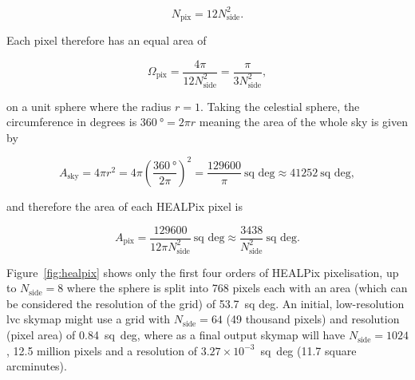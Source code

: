 \begin{colsection}
\begin{colsection}
\begin{equation}
    N_\text{pix} = 12 N_\text{side}^2.
    \label{eq:healpix_npix}
\end{equation}

Each pixel therefore has an equal area of

\begin{equation}
    \Omega_\text{pix} = \frac{4\pi}{12 N_\text{side}^2} = \frac{\pi}{3 N_\text{side}^2},
    \label{eq:healpix_area}
\end{equation}

on a unit sphere where the radius $r=1$. Taking the celestial sphere, the circumference in degrees is $\SI{360}{\degree} = 2 \pi r$ meaning the area of the whole sky is given by

\begin{equation}
    A_\text{sky} = 4 \pi r^2 = 4 \pi \left ( \frac{\SI{360}{\degree}}{2 \pi} \right )^2 = \frac{129600}{\pi}~\text{sq deg} \approx 41252~\text{sq deg} , %
    \label{eq:sky_area}
\end{equation}

and therefore the area of each HEALPix pixel is

\begin{equation}
    A_\text{pix} = \frac{129600}{12 \pi N_\text{side}^2}~\text{sq~deg} \approx \frac{3438}{N_\text{side}^2}~\text{sq~deg}.
    \label{eq:healpix_area_degrees}
\end{equation}

Figure~\ref{fig:healpix} shows only the first four orders of HEALPix pixelisation, up to $N_\text{side} = 8$ where the sphere is split into 768 pixels each with an area (which can be considered the resolution of the grid) of 53.7~sq deg. An initial, low-resolution \gls{lvc} skymap might use a grid with $N_\text{side} = 64$ (49 thousand pixels) and resolution (pixel area) of 0.84~sq~deg, where as a final output skymap will have $N_\text{side} = 1024$, 12.5 million pixels and a resolution of $3.27 \times 10^{-3}$~sq~deg (11.7 square arcminutes).


\end{colsection}
\end{colsection}
